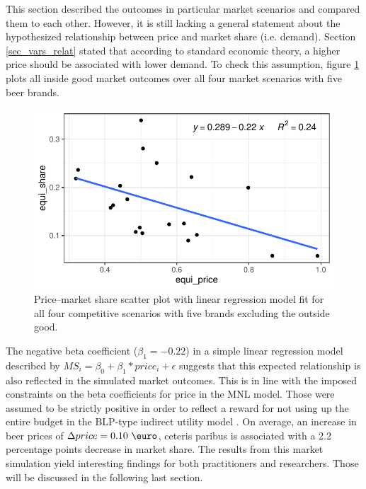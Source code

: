 \documentclass[12pt,a4paper]{article}
\begin{document}
This section described the outcomes in particular market scenarios and compared them to each other.
However, it is still lacking a general statement about the hypothesized relationship between price and market share (i.e. demand).
Section \ref{sec_vars_relat} stated that according to standard economic theory, a higher price should be associated with lower demand.
To check this assumption, figure \ref{fig_scatter_brand_comp} plots all inside good market outcomes over all four market scenarios with five beer brands.

\begin{figure}[ht]
	\centering
  \includegraphics[scale = 0.8]{figures/scatter_price_share_all_five_scenarios.pdf}
	\caption{Price--market share scatter plot with linear regression model fit for all four competitive scenarios with five brands excluding the outside good.}
	\label{fig_scatter_brand_comp}
\end{figure}

The negative beta coefficient ($\beta_1 = -0.22$) in a simple linear regression model described by $MS_i = \beta_0 + \beta_1 * price_i + \epsilon$ suggests that this expected relationship is also reflected in the simulated market outcomes.
This is in line with the imposed constraints on the beta coefficients for price in the MNL model.
Those were assumed to be strictly positive in order to reflect a reward for not using up the entire budget in the BLP-type indirect utility model \citep{berryAutomobilePricesMarket1995}.
On average, an increase in beer prices of $\Delta price = 0.10 \text{ \euro}$, ceteris paribus is associated with a 2.2 percentage points decrease in market share. The results from this market simulation yield interesting findings for both practitioners and researchers.
Those will be discussed in the following last section.
\end{document}
